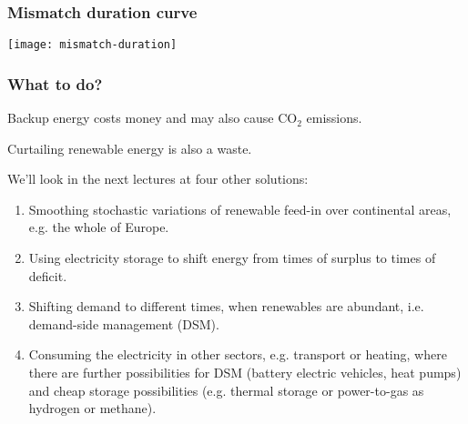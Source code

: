 \documentclass[10pt,aspectratio=169,dvipsnames]{beamer}
\let\olditem\item
\renewcommand{\item}{%
\olditem\vspace{5pt}}
\begin{document}
\begin{frame}
  \frametitle{Mismatch duration curve}


  \centering
  \texttt{[image: mismatch-duration]}


\end{frame}



\begin{frame}
  \frametitle{What to do?}

  Backup energy costs money and may also cause CO${}_2$ emissions.

  Curtailing renewable energy is also a waste.

  We'll look in the next lectures at \alert{four other solutions}:
  \begin{enumerate}
  \item \alert{Smoothing} stochastic variations of renewable feed-in \alert{over continental areas}, e.g. the whole of Europe.
  \item Using \alert{electricity storage} to shift energy from times of surplus to times of deficit.
  \item Shifting demand to different times, when renewables are abundant, i.e. \alert{demand-side management} (DSM).
    \item Consuming the electricity in \alert{other sectors}, e.g. transport or heating, where there are further possibilities for DSM (battery electric vehicles, heat pumps)  and cheap storage possibilities (e.g. thermal storage or power-to-gas as hydrogen or methane).
  \end{enumerate}



\end{frame}
\end{document}

